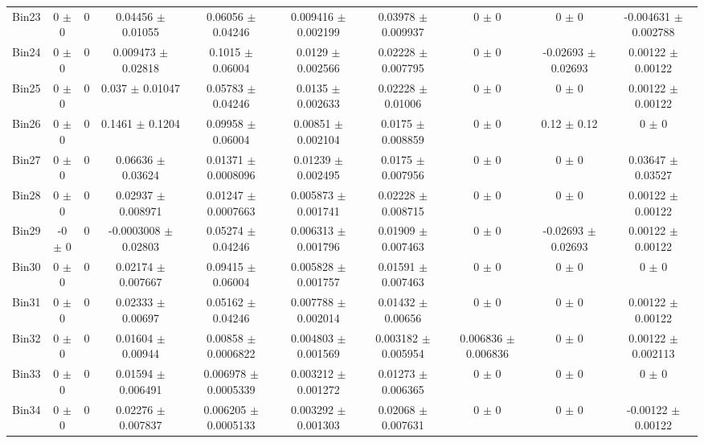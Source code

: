 \begin{tabular}{@{\extracolsep{4pt}}lccccccccc@{}}
     Bin23 & 0 $\pm$ 0 & 0 & 0.04456 $\pm$ 0.01055 & 0.06056 $\pm$ 0.04246 & 0.009416 $\pm$ 0.002199 & 0.03978 $\pm$ 0.009937 & 0 $\pm$ 0 & 0 $\pm$ 0 & -0.004631 $\pm$ 0.002788 \\ 
     Bin24 & 0 $\pm$ 0 & 0 & 0.009473 $\pm$ 0.02818 & 0.1015 $\pm$ 0.06004 & 0.0129 $\pm$ 0.002566 & 0.02228 $\pm$ 0.007795 & 0 $\pm$ 0 & -0.02693 $\pm$ 0.02693 & 0.00122 $\pm$ 0.00122 \\ 
     Bin25 & 0 $\pm$ 0 & 0 & 0.037 $\pm$ 0.01047 & 0.05783 $\pm$ 0.04246 & 0.0135 $\pm$ 0.002633 & 0.02228 $\pm$ 0.01006 & 0 $\pm$ 0 & 0 $\pm$ 0 & 0.00122 $\pm$ 0.00122 \\ 
     Bin26 & 0 $\pm$ 0 & 0 & 0.1461 $\pm$ 0.1204 & 0.09958 $\pm$ 0.06004 & 0.00851 $\pm$ 0.002104 & 0.0175 $\pm$ 0.008859 & 0 $\pm$ 0 & 0.12 $\pm$ 0.12 & 0 $\pm$ 0 \\ 
     Bin27 & 0 $\pm$ 0 & 0 & 0.06636 $\pm$ 0.03624 & 0.01371 $\pm$ 0.0008096 & 0.01239 $\pm$ 0.002495 & 0.0175 $\pm$ 0.007956 & 0 $\pm$ 0 & 0 $\pm$ 0 & 0.03647 $\pm$ 0.03527 \\ 
     Bin28 & 0 $\pm$ 0 & 0 & 0.02937 $\pm$ 0.008971 & 0.01247 $\pm$ 0.0007663 & 0.005873 $\pm$ 0.001741 & 0.02228 $\pm$ 0.008715 & 0 $\pm$ 0 & 0 $\pm$ 0 & 0.00122 $\pm$ 0.00122 \\ 
     Bin29 & -0 $\pm$ 0 & 0 & -0.0003008 $\pm$ 0.02803 & 0.05274 $\pm$ 0.04246 & 0.006313 $\pm$ 0.001796 & 0.01909 $\pm$ 0.007463 & 0 $\pm$ 0 & -0.02693 $\pm$ 0.02693 & 0.00122 $\pm$ 0.00122 \\ 
     Bin30 & 0 $\pm$ 0 & 0 & 0.02174 $\pm$ 0.007667 & 0.09415 $\pm$ 0.06004 & 0.005828 $\pm$ 0.001757 & 0.01591 $\pm$ 0.007463 & 0 $\pm$ 0 & 0 $\pm$ 0 & 0 $\pm$ 0 \\ 
     Bin31 & 0 $\pm$ 0 & 0 & 0.02333 $\pm$ 0.00697 & 0.05162 $\pm$ 0.04246 & 0.007788 $\pm$ 0.002014 & 0.01432 $\pm$ 0.00656 & 0 $\pm$ 0 & 0 $\pm$ 0 & 0.00122 $\pm$ 0.00122 \\ 
     Bin32 & 0 $\pm$ 0 & 0 & 0.01604 $\pm$ 0.00944 & 0.00858 $\pm$ 0.0006822 & 0.004803 $\pm$ 0.001569 & 0.003182 $\pm$ 0.005954 & 0.006836 $\pm$ 0.006836 & 0 $\pm$ 0 & 0.00122 $\pm$ 0.002113 \\ 
     Bin33 & 0 $\pm$ 0 & 0 & 0.01594 $\pm$ 0.006491 & 0.006978 $\pm$ 0.0005339 & 0.003212 $\pm$ 0.001272 & 0.01273 $\pm$ 0.006365 & 0 $\pm$ 0 & 0 $\pm$ 0 & 0 $\pm$ 0 \\ 
     Bin34 & 0 $\pm$ 0 & 0 & 0.02276 $\pm$ 0.007837 & 0.006205 $\pm$ 0.0005133 & 0.003292 $\pm$ 0.001303 & 0.02068 $\pm$ 0.007631 & 0 $\pm$ 0 & 0 $\pm$ 0 & -0.00122 $\pm$ 0.00122 \\ 

\end{tabular}
